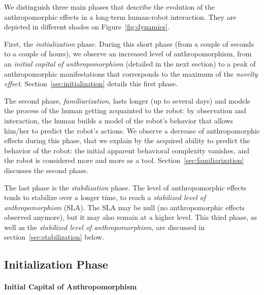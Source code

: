 \documentclass{frontiersSCNS} %
\begin{document}
We distinguish three main phases that describe the evolution of the
anthropomorphic effects in a long-term human-robot interaction. They are
depicted in different shades on Figure~\ref{fig:dynamics}.

First, the \emph{initialization} phase. During this short phase (from a couple
of seconds to a couple of hours), we observe an increased level of
anthropomorphism, from an \emph{initial capital of anthropomorphism}
(detailed in the next section) to a peak of anthropomorphic manifestations
that corresponds to the maximum of the \emph{novelty effect}.
Section~\ref{sec:initialization} details this first phase.

The second phase, \emph{familiarization}, lasts longer (up to several days) and
models the process of the human getting acquainted to the robot: by observation
and interaction, the human builds a model of the robot's behavior that allows
him/her to predict the robot's actions. We observe a decrease of
anthropomorphic effects during this phase, that we explain by the acquired
ability to predict the behavior of the robot: the initial apparent behavioral
complexity vanishes, and the robot is considered more and more as a tool.
Section~\ref{sec:familiarization} discusses the second phase.

The last phase is the \emph{stabilization} phase. The level of anthropomorphic
effects tends to stabilize over a longer time, to reach a \emph{stabilized
level of anthropomorphism} (SLA). The SLA may be null (no anthropomorphic
effects observed anymore), but it may also remain at a higher level.  This
third phase, as well as the \emph{stabilized level of anthropomorphism}, are
discussed in section~\ref{sec:stabilization} below.

\subsection*{Initialization Phase}
\label{sec:initialization}

\paragraph{Initial Capital of Anthropomorphism}
\label{sec:ica}
\end{document}
